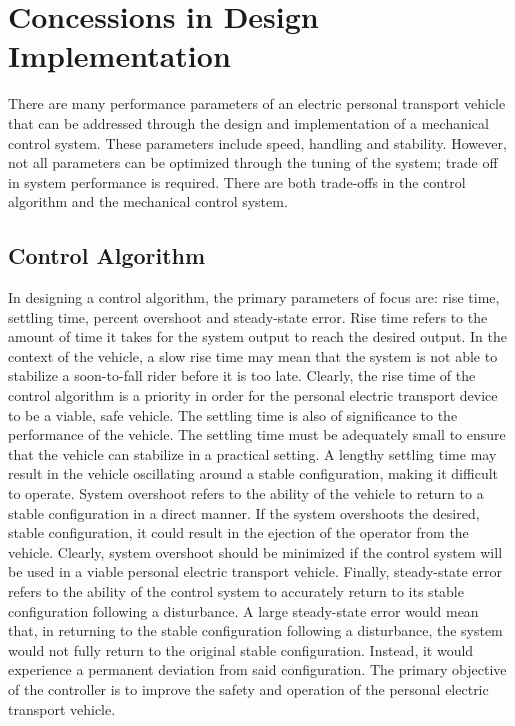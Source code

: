 \section{Concessions in Design Implementation}
There are many performance parameters of an electric personal transport vehicle that can be addressed through the design and implementation of a mechanical control system. 
These parameters include speed, handling and stability. 
However, not all parameters can be optimized through the tuning of the system; trade off in system performance is required. 
There are both trade-offs in the control algorithm and the mechanical control system.

\subsection{Control Algorithm} 
In designing a control algorithm, the primary parameters of focus are: rise time, settling time, percent overshoot and steady-state error. 
Rise time refers to the amount of time it takes for the system output to reach the desired output. 
In the context of the vehicle, a slow rise time may mean that the system is not able to stabilize a soon-to-fall rider before it is too late. 
Clearly, the rise time of the control algorithm is a priority in order for the personal electric transport device to be a viable, safe vehicle.
The settling time is also of significance to the performance of the vehicle. 
The settling time must be adequately small to ensure that the vehicle can stabilize in a practical setting. 
A lengthy settling time may result in the vehicle oscillating around a stable configuration, making it difficult to operate. 
System overshoot refers to the ability of the vehicle to return to a stable configuration in a direct manner. 
If the system overshoots the desired, stable configuration, it could result in the ejection of the operator from the vehicle. 
Clearly, system overshoot should be minimized if the control system will be used in a viable personal electric transport vehicle. 
Finally, steady-state error refers to the ability of the control system to accurately return to its stable configuration following a disturbance. 
A large steady-state error would mean that, in returning to the stable configuration following a disturbance, the system would not fully return to the original stable configuration. 
Instead, it would experience a permanent deviation from said configuration. 
The primary objective of the controller is to improve the safety and operation of the personal electric transport vehicle. 

